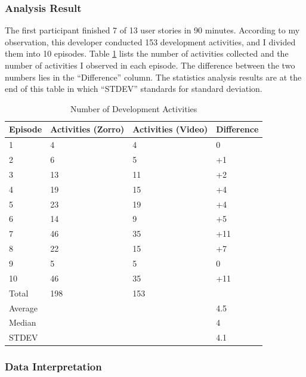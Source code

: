 \subsubsection{Analysis Result}
The first participant finished 7 of 13 user stories in 90
minutes. According to my observation, this developer conducted 153
development activities, and I divided them into 10 episodes. Table
\ref{tab:ActivityNumber} lists the number of activities collected 
and the number of activities I observed in each episode. The
difference between the two numbers lies in the ``Difference'' column. 
The statistics analysis results are at the end of this table in 
which ``STDEV'' standards for standard deviation.
\begin{table}[!h]
\centering
  \begin{tabular}{|l|l|l|l|}
  \hline
    Episode &  Activities (Zorro)& Activities (Video) & Difference \\ \hline
    1	      &   4 &   4  &   0   \\ \hline
    2	      &   6 &   5  &  +1   \\ \hline
    3       &  13 &  11  &  +2   \\ \hline
    4       &  19 &  15  &  +4   \\ \hline
    5       &  23 &  19  &  +4   \\ \hline
    6       &  14 &   9  &  +5   \\ \hline
    7       &  46 &  35  &  +11  \\ \hline
    8       &  22 &  15  &  +7   \\ \hline
    9       &   5 &   5  &   0   \\ \hline
    10      &  46 &  35  &  +11  \\ \hline \hline
    Total   & 198 & 153  &       \\ \hline
    Average &     &      &  4.5  \\ \hline
    Median  &     &      &  4    \\ \hline
    STDEV   &     &      &  4.1  \\ \hline
    \end{tabular}
  \caption{Number of Development Activities}\label{tab:ActivityNumber}  
\end{table}

\subsubsection{Data Interpretation}

